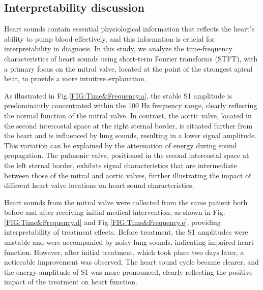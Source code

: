 \subsection{Interpretability discussion}
Heart sounds contain essential physiological information that reflects the heart's ability to pump blood effectively, and this information is crucial for interpretability in diagnosis. In this study, we analyze the time-frequency characteristics of heart sounds using short-term Fourier transforms (STFT), with a primary focus on the mitral valve, located at the point of the strongest apical beat, to provide a more intuitive explanation.

As illustrated in Fig.\ref{FIG:Time&Frequency.a}, the stable S1 amplitude is predominantly concentrated within the 100 Hz frequency range, clearly reflecting the normal function of the mitral valve. In contrast, the aortic valve, located in the second intercostal space at the right sternal border, is situated further from the heart and is influenced by lung sounds, resulting in a lower signal amplitude. This variation can be explained by the attenuation of energy during sound propagation. The pulmonic valve, positioned in the second intercostal space at the left sternal border, exhibits signal characteristics that are intermediate between those of the mitral and aortic valves, further illustrating the impact of different heart valve locations on heart sound characteristics.

Heart sounds from the mitral valve were collected from the same patient both before and after receiving initial medical intervention, as shown in Fig.\ref{FIG:Time&Frequency.d} and Fig.\ref{FIG:Time&Frequency.e}, providing interpretability of treatment effects. Before treatment, the S1 amplitudes were unstable and were accompanied by noisy lung sounds, indicating impaired heart function. However, after initial treatment, which took place two days later, a noticeable improvement was observed. The heart sound cycle became clearer, and the energy amplitude of S1 was more pronounced, clearly reflecting the positive impact of the treatment on heart function.

